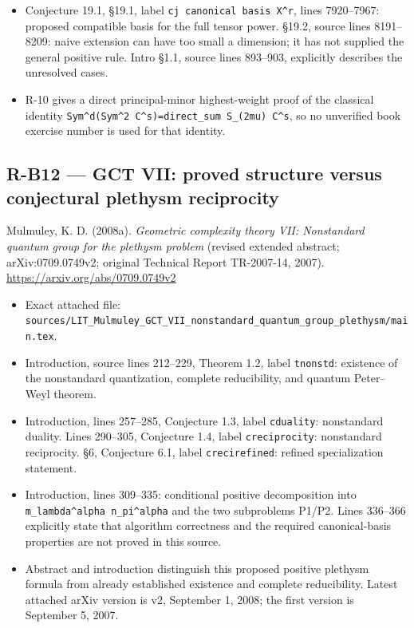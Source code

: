 \documentclass[11pt,a4paper]{article}
\providecommand{\tightlist}{\setlength{\itemsep}{0pt}\setlength{\parskip}{0pt}}
\theoremstyle{definition}\newtheorem{definition}{Definition}
\begin{document}
\begin{itemize}
  \nolinkurl{check_n2_formulas.py}.
\item
  Conjecture 19.1, §19.1, label \texttt{cj\ canonical\ basis\ X\^{}r},
  lines 7920--7967: proposed compatible basis for the full tensor power.
  §19.2, source lines 8191--8209: naive extension can have too small a
  dimension; it has not supplied the general positive rule. Intro §1.1,
  source lines 893--903, explicitly describes the unresolved cases.
\item
  R-10 gives a direct principal-minor highest-weight proof of the
  classical identity
  \texttt{Sym\^{}d(Sym\^{}2\ C\^{}s)=direct\_sum\ S\_(2mu)\ C\^{}s}, so
  no unverified book exercise number is used for that identity.
\end{itemize}

\subsection{R-B12 --- GCT VII: proved structure versus conjectural
plethysm
reciprocity}\label{r-b12--gct-vii-proved-structure-versus-conjectural-plethysm-reciprocity}

Mulmuley, K. D. (2008a). \emph{Geometric complexity theory VII:
Nonstandard quantum group for the plethysm problem} (revised extended
abstract; arXiv:0709.0749v2; original Technical Report TR-2007-14,
2007). \url{https://arxiv.org/abs/0709.0749v2}

\begin{itemize}
\tightlist
\item
  Exact attached file:
  \nolinkurl{sources/LIT_Mulmuley_GCT_VII_nonstandard_quantum_group_plethysm/main.tex}.
\item
  Introduction, source lines 212--229, Theorem 1.2, label
  \nolinkurl{tnonstd}: existence of the nonstandard quantization, complete
  reducibility, and quantum Peter--Weyl theorem.
\item
  Introduction, lines 257--285, Conjecture 1.3, label \nolinkurl{cduality}:
  nonstandard duality. Lines 290--305, Conjecture 1.4, label
  \nolinkurl{creciprocity}: nonstandard reciprocity. §6, Conjecture 6.1,
  label \nolinkurl{crecirefined}: refined specialization statement.
\item
  Introduction, lines 309--335: conditional positive decomposition into
  \texttt{m\_lambda\^{}alpha\ n\_pi\^{}alpha} and the two subproblems
  P1/P2. Lines 336--366 explicitly state that algorithm correctness and
  the required canonical-basis properties are not proved in this source.
\item
  Abstract and introduction distinguish this proposed positive plethysm
  formula from already established existence and complete reducibility.
  Latest attached arXiv version is v2, September 1, 2008; the first
  version is September 5, 2007.
\end{itemize}
\end{document}
